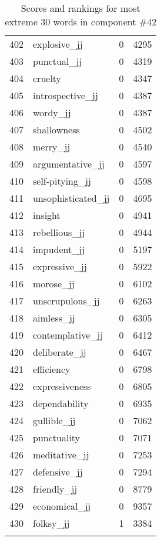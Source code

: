 \begin{longtable}[!htbp]{| rlr@{.}l |}
    402 & explosive\_jj & 0 & 4295 \\
    403 & punctual\_jj & 0 & 4319 \\
    404 & cruelty & 0 & 4347 \\
    405 & introspective\_jj & 0 & 4387 \\
    406 & wordy\_jj & 0 & 4387 \\
    407 & shallowness & 0 & 4502 \\
    408 & merry\_jj & 0 & 4540 \\
    409 & argumentative\_jj & 0 & 4597 \\
    410 & self-pitying\_jj & 0 & 4598 \\
    411 & unsophisticated\_jj & 0 & 4695 \\
    412 & insight & 0 & 4941 \\
    413 & rebellious\_jj & 0 & 4944 \\
    414 & impudent\_jj & 0 & 5197 \\
    415 & expressive\_jj & 0 & 5922 \\
    416 & morose\_jj & 0 & 6102 \\
    417 & unscrupulous\_jj & 0 & 6263 \\
    418 & aimless\_jj & 0 & 6305 \\
    419 & contemplative\_jj & 0 & 6412 \\
    420 & deliberate\_jj & 0 & 6467 \\
    421 & efficiency & 0 & 6798 \\
    422 & expressiveness & 0 & 6805 \\
    423 & dependability & 0 & 6935 \\
    424 & gullible\_jj & 0 & 7062 \\
    425 & punctuality & 0 & 7071 \\
    426 & meditative\_jj & 0 & 7253 \\
    427 & defensive\_jj & 0 & 7294 \\
    428 & friendly\_jj & 0 & 8779 \\
    429 & economical\_jj & 0 & 9357 \\
    430 & folksy\_jj & 1 & 3384 \\
    \hline
    \caption{Scores and rankings for most extreme 30 words in component \#42} \\
\end{longtable}
